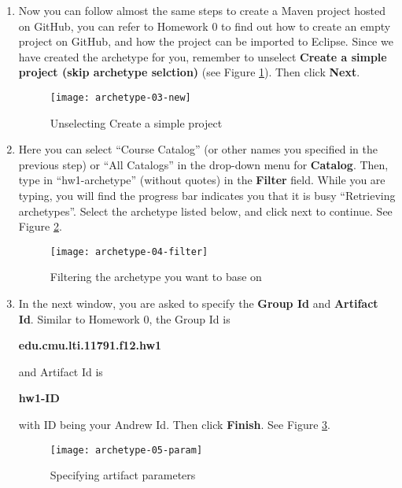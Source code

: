 \begin{enumerate}
\item Now you can follow almost the same steps to create a Maven project hosted
on GitHub, you can refer to Homework 0 to find out how to create an empty
project on GitHub, and how the project can be imported to Eclipse. Since we have
created the archetype for you, remember to unselect \textbf{Create a simple
project (skip archetype selction)} (see Figure \ref{fig:archetype-03-new}). Then
click \textbf{Next}.
 
\begin{figure}[t]
\centering
\texttt{[image: archetype-03-new]}
\caption{Unselecting Create a simple project\label{fig:archetype-03-new}}
\end{figure}

\item Here you can select ``Course Catalog'' (or other names you specified in
the previous step) or ``All Catalogs'' in the drop-down menu for
\textbf{Catalog}. Then, type in ``hw1-archetype'' (without quotes) in the \textbf{Filter}
field. While you are typing, you will find the progress bar indicates you that
it is busy ``Retrieving archetypes''. Select the archetype listed below, and
click next to continue. See Figure \ref{fig:archetype-04-filter}.

\begin{figure}[t]
\centering
\texttt{[image: archetype-04-filter]}
\caption{Filtering the archetype you want to base on\label{fig:archetype-04-filter}}
\end{figure}

\item In the next window, you are asked to specify the \textbf{Group Id} and
\textbf{Artifact Id}. Similar to Homework 0, the Group Id is

\begin{center}
\textbf{edu.cmu.lti.11791.f12.hw1}
\end{center}

and Artifact Id is

\begin{center}
\textbf{hw1-ID}
\end{center}

with ID being your Andrew Id. Then click \textbf{Finish}. See Figure
\ref{fig:archetype-05-param}.

\begin{figure}[t]
\centering
\texttt{[image: archetype-05-param]}
\caption{Specifying artifact parameters\label{fig:archetype-05-param}}
\end{figure}


\end{enumerate}
